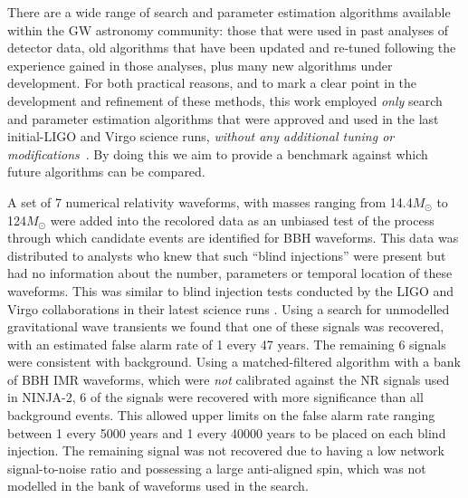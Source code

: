 \documentclass[12pt]{iopart}
\begin{document}
There are a wide range of search and parameter estimation algorithms available
within the GW astronomy community: those that were used in past analyses of
detector data, old algorithms that have been updated and re-tuned following the
experience gained in those analyses, plus many new algorithms under
development. For both practical reasons, and to mark a clear point in the
development and refinement of these methods, this work employed \emph{only}
search and parameter estimation algorithms that were approved and used in the
last initial-LIGO and Virgo science runs, \emph{without any additional tuning
or 
modifications}~\cite{Klimenko:2008fu,Babak:2012zx,Aasi:2012rja,
Abadie:2012rq}. By doing this we aim to provide a benchmark against which
future algorithms can be compared.

A set of 7 numerical relativity waveforms, with
masses ranging from 14.4$M_{\odot}$ to 124$M_{\odot}$ were added into
the recolored data as an unbiased test of the process through which candidate 
events are identified for BBH waveforms. This 
data was distributed to analysts who
knew that such ``blind injections'' were present but had no
information about the number, parameters or temporal location of these
waveforms. This was similar to blind injection tests conducted by the
LIGO and Virgo collaborations in their latest science runs
\cite{Colaboration:2011np}. Using a search for unmodelled gravitational wave 
transients we found that one of these signals was recovered, with an estimated 
false alarm rate of 1 every 47 years. The
remaining 6 signals were consistent with background. Using a
matched-filtered algorithm with a bank of BBH IMR waveforms, which were 
\emph{not} calibrated against the NR signals used in NINJA-2, 6 of the
signals were recovered with more significance than all background
events. This allowed upper limits on the false alarm rate ranging
between 1 every 5000 years and 1 every 40000 years to be placed on
each blind injection. The remaining signal was not recovered due to
having a low network signal-to-noise ratio and possessing a large
anti-aligned spin, which was not modelled in the bank of waveforms used in the 
search.
\end{document}
